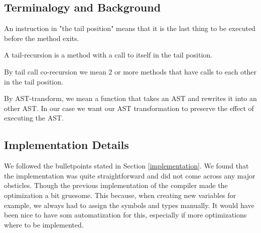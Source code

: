 \subsection{Terminalogy and Background}
An instruction in "the tail position" means that it is the last thing to be executed before the method exits.

A tail-recursion is a method with a call to itself in the tail position.

By tail call co-recursion we mean 2 or more methods that have calls to each other in the tail position.

By AST-transform, we mean a function that takes an AST and rewrites it into an other AST. In our case we want our AST transformation to preserve the effect of executing the AST.

\subsection{Implementation Details}
\label{sec:details}
We followed the bulletpoints stated in Section \ref{implementation}. We found that the implementation was quite straightforward and did not 
come across any major obsticles. Though the previous implementation of the compiler made the optimization a bit gruesome. This because, when creating
new variables for example, we always had to assign the symbols and types manually. It would have been nice to have som automatization for this, 
especially if more optimizations where to be implemented.
